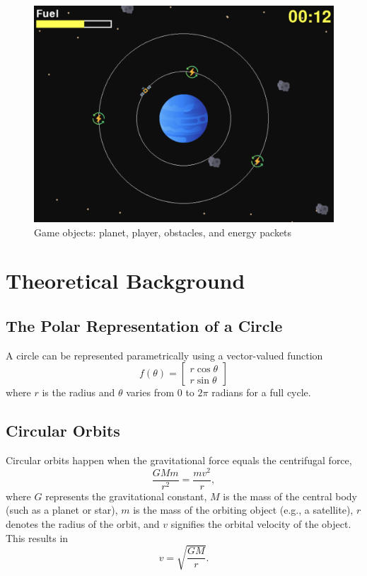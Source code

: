 \documentclass[11pt, a4paper]{article}
\begin{document}
\begin{figure}[h]
\centering
\includegraphics[scale=0.5]{figure1}
\caption{Game objects: planet, player, obstacles, and energy packets}
\end{figure}

\section{Theoretical Background}
\subsection{The Polar Representation of a Circle}
A circle can be represented parametrically using a vector-valued function
$$f(\theta) = \begin{bmatrix}
r\cos\theta \\
r\sin\theta \end{bmatrix}$$
where $r$ is the radius and $\theta$ varies from 0 to $2\pi$ radians for a full cycle.

\subsection{Circular Orbits}
Circular orbits happen when the gravitational force equals the centrifugal force,
$$\dfrac{GMm}{r^2}=\dfrac{mv^2}{r},$$
where $G$ represents the gravitational constant, $M$ is the mass of the central body (such as a planet or star), $m$ is the mass of the orbiting object (e.g., a satellite), $r$ denotes the radius of the orbit, and $v$ signifies the orbital velocity of the object. This results in
$$v=\sqrt{\dfrac{GM}{r}}.$$
\end{document}
